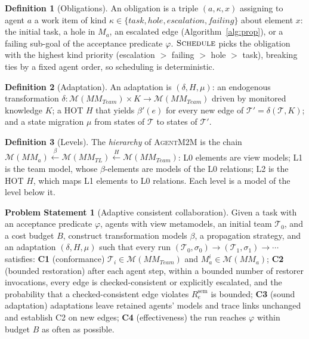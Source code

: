 \documentclass[10pt, anonymous, conference]{IEEEtran}
\theoremstyle{definition}
\newtheorem{definition}{Definition}[section]
\newtheorem{problem}{Problem Statement}[section]
\theoremstyle{plain}
\theoremstyle{remark}
\newcommand{\tool}{\textsc{AgentM2M}}
\newcommand{\MM}{\mathit{MM}}
\newcommand{\Mods}[1]{\mathcal{M}(#1)}
\newcommand{\TL}{\mathit{TL}}
\newcommand{\Team}{\mathit{Team}}
\newcommand{\team}{\mathcal{T}}
\newcommand{\sem}{\mathrm{sem}}
\begin{document}
\begin{definition}[Obligations]\label{def:obl}
An obligation is a triple $(a,\kappa,x)$ assigning to agent $a$ a work item of
kind $\kappa\in\{\mathit{task},\mathit{hole},\mathit{escalation},
\mathit{failing}\}$ about element $x$: the initial task, a hole in $M_a$, an
escalated edge (Algorithm~\ref{alg:prop}), or a failing sub-goal of the
acceptance predicate $\varphi$. $\textsc{Schedule}$ picks the obligation with
the highest kind priority (escalation $>$ failing $>$ hole $>$ task), breaking
ties by a fixed agent order, so scheduling is deterministic.
\end{definition}

\begin{definition}[Adaptation]\label{def:adapt}
An adaptation is $(\delta,H,\mu)$: an endogenous transformation
$\delta\colon\Mods{\MM_{\Team}}\times K\to\Mods{\MM_{\Team}}$ driven by
monitored knowledge $K$; a HOT $H$ that yields $\beta'(e)$ for every new edge of
$\team'=\delta(\team,K)$; and a state migration $\mu$ from states of $\team$ to
states of $\team'$.
\end{definition}

\begin{definition}[Levels]\label{def:levels}
The \emph{hierarchy} of \tool{} is the chain
$\Mods{\MM_a}\xleftarrow{\ \beta\ }\Mods{\MM_{\TL}}\xleftarrow{\ H\ }
\Mods{\MM_{\Team}}$: L0 elements are view models; L1 is the team model, whose
$\beta$-elements are models of the L0 relations; L2 is the HOT $H$, which maps
L1 elements to L0 relations. Each level is a model of the level below it.
\end{definition}

\begin{problem}[Adaptive consistent collaboration]\label{prob:main}
Given a task with an acceptance predicate $\varphi$, agents with view
metamodels, an initial team $\team_0$, and a cost budget $B$, construct
transformation models $\beta$, a propagation strategy, and an adaptation
$(\delta,H,\mu)$ such that every run
$(\team_0,\sigma_0)\to(\team_1,\sigma_1)\to\cdots$ satisfies:
\textbf{C1} (conformance) $\team_i\in\Mods{\MM_{\Team}}$ and
$M^i_a\in\Mods{\MM_a}$;
\textbf{C2} (bounded restoration) after each agent step, within a bounded
number of restorer invocations, every edge is checked-consistent or explicitly
escalated, and the probability that a checked-consistent edge violates
$R_e^{\sem}$ is bounded;
\textbf{C3} (sound adaptation) adaptations leave retained agents' models and
trace links unchanged and establish C2 on new edges;
\textbf{C4} (effectiveness) the run reaches $\varphi$ within budget $B$ as
often as possible.
\end{problem}
\end{document}
